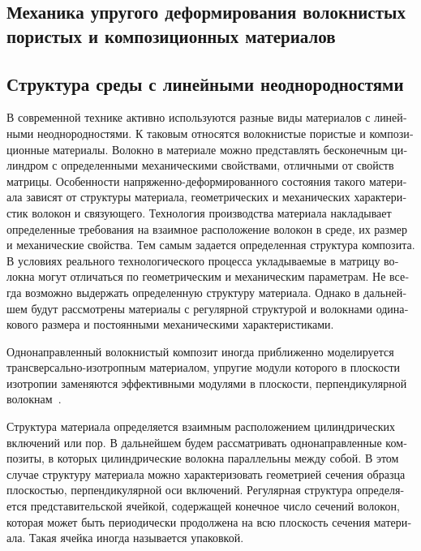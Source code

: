 
\begin{russian}
\chapter[Механика упругого деформирования волокнистых пористых и композиционных материалов]{Механика упругого деформирования волокнистых пористых и композиционных материалов}

\section[Структура среды с линейными неоднородностями]{Структура среды с линейными неоднородностями}

В современной технике активно используются разные виды материалов с линейными неоднородностями. К таковым относятся волокнистые пористые и композиционные материалы. Волокно в материале можно представлять бесконечным цилиндром с определенными механическими свойствами, отличными от свойств матрицы. Особенности напряженно-деформированного состояния такого материала зависят от структуры материала, геометрических и механических характеристик волокон и связующего. Технология производства материала накладывает определенные требования на взаимное расположение волокон в среде, их размер и механические свойства. Тем самым задается определенная структура композита. В условиях реального технологического процесса укладываемые в матрицу волокна могут отличаться по геометрическим и механическим параметрам. Не всегда возможно выдержать определенную структуру материала. Однако в дальнейшем будут рассмотрены материалы с регулярной структурой и волокнами одинакового размера и постоянными механическими характеристиками.

Однонаправленный волокнистый композит иногда приближенно моделируется трансверсально-изотропным материалом, упругие модули которого в плоскости изотропии заменяются эффективными модулями в плоскости, перпендикулярной волокнам~\cite{Vanin1985, Lekhnitskiy}.

Структура материала определяется взаимным расположением цилиндрических включений или пор. В дальнейшем будем рассматривать однонаправленные композиты, в которых цилиндрические волокна параллельны между собой. В этом случае структуру материала можно характеризовать геометрией сечения образца плоскостью, перпендикулярной оси включений. Регулярная структура определяется представительской ячейкой, содержащей конечное число сечений волокон, которая может быть периодически продолжена на всю плоскость сечения материала. Такая ячейка иногда называется упаковкой.


\end{russian}
